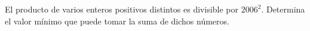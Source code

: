 El producto de varios enteros positivos distintos es divisible por ${2006}^{2}$. Determina el valor mínimo que puede tomar la suma de dichos números.
